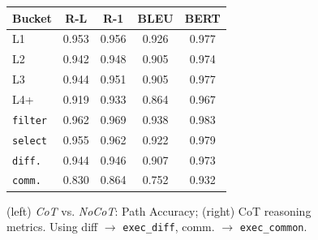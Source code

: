 \documentclass[11pt]{article}
\begin{document}
\begin{figure}[t]
\begin{minipage}[c]{0.49\textwidth}

\begin{center}
\vspace{-15pt}\vspace{-15pt}
\end{center}
  \label{fig:cot-nocot-sub}
\end{minipage}
\hfill
\begin{minipage}[c]{0.50\textwidth} %
\centering
\footnotesize
\setlength{\tabcolsep}{4pt}
\renewcommand{\arraystretch}{0.9}
\begin{tabular}{l|S S S S}
\toprule
\textbf{Bucket} & {\textbf{R-L}} & {\textbf{R-1}} & {\textbf{BLEU}} & {\textbf{BERT}} \\
\midrule
L1   & 0.953 & 0.956 & 0.926 & 0.977 \\
L2   & 0.942 & 0.948 & 0.905 & 0.974 \\
L3   & 0.944 & 0.951 & 0.905 & 0.977 \\
L4+  & 0.919 & 0.933 & 0.864 & 0.967 \\
\cmidrule(lr){1-5}
\texttt{filter}            & 0.962 & 0.969 & 0.938 & 0.983 \\
\texttt{select}            & 0.955 & 0.962 & 0.922 & 0.979 \\
\texttt{diff.}  & 0.944 & 0.946 & 0.907 & 0.973 \\
\texttt{comm.}      & 0.830 & 0.864 & 0.752 & 0.932 \\
\bottomrule
\end{tabular}
  \label{tab:reasoning-metrics-sub}
\end{minipage}



\caption{(left)\textit{ CoT }vs. \textit{NoCoT}: Path Accuracy; (right) CoT reasoning metrics. Using diff $\xrightarrow{}$ \texttt{exec\_diff}, comm. $\xrightarrow{}$ \texttt{exec\_common}.}
\label{fig:cot-nocot-with-table}
\end{figure}
\end{document}
